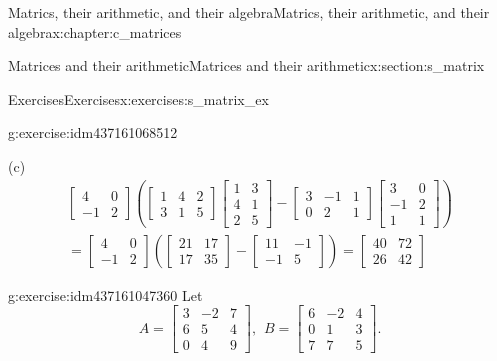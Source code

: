 \documentclass[oneside,10pt,]{book}
\numberwithin{equation}{section}
\newcommand{\amp}{&}
\begin{document}
\begin{chapterptx}{Matrics, their arithmetic, and their algebra}{}{Matrics, their arithmetic, and their algebra}{}{}{x:chapter:c_matrices}
\begin{sectionptx}{Matrices and their arithmetic}{}{Matrices and their arithmetic}{}{}{x:section:s_matrix}
\begin{exercises-subsection-numberless}{Exercises}{}{Exercises}{}{}{x:exercises:s_matrix_ex}
\begin{divisionexercise}{2}{}{}{g:exercise:idm437161068512}
\par
(c)%
\begin{align*}
\begin{bmatrix}4\amp 0\\ -1\amp 2 \end{bmatrix} \left( \begin{bmatrix}1\amp 4\amp 2\\ 3\amp 1\amp 5 \end{bmatrix} \begin{bmatrix}1\amp 3\\ 4\amp 1\\ 2\amp 5 \end{bmatrix} - \begin{bmatrix}3\amp -1\amp 1\\ 0\amp 2\amp 1 \end{bmatrix} \begin{bmatrix}3\amp 0\\ -1\amp 2\\ 1\amp 1 \end{bmatrix} \right)\\
= \begin{bmatrix}4\amp 0\\ -1\amp 2 \end{bmatrix} \left( \begin{bmatrix}21\amp 17\\ 17\amp 35 \end{bmatrix} - \begin{bmatrix}11\amp -1\\ -1\amp 5 \end{bmatrix} \right) = \begin{bmatrix}40\amp 72\\ 26\amp 42 \end{bmatrix}
\end{align*}
%
\end{divisionexercise}%
\begin{divisionexercise}{3}{}{}{g:exercise:idm437161047360}%
Let%
\begin{equation*}
A = \begin{bmatrix}3\amp -2\amp 7\\ 6\amp 5\amp 4\\ 0\amp 4\amp 9 \end{bmatrix} , \hspace{5pt} B = \begin{bmatrix}6\amp -2\amp 4\\ 0\amp 1\amp 3\\ 7\amp 7\amp 5 \end{bmatrix}\text{.}

\end{equation*}
\end{divisionexercise}
\end{exercises-subsection-numberless}
\end{sectionptx}
\end{chapterptx}
\end{document}
